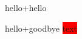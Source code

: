 \documentclass{article}
\begin{document}
\def\bar{hello}
\let\fooi\bar
\def\fooii{\bar}
\fooi +\fooii

\def\bar{goodbye}
\fooi +\fooii
\def\red{red}
\colorbox{\red}{text}
\end{document}
